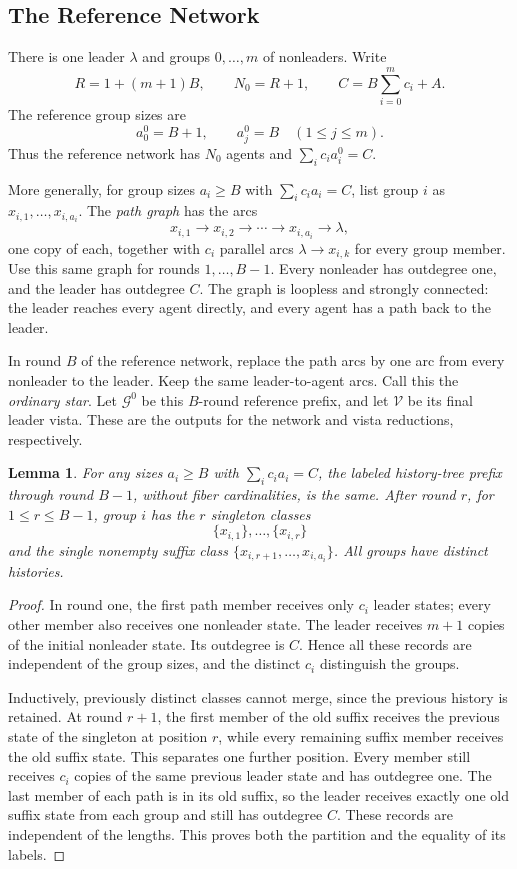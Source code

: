 \documentclass[11pt]{article}
\newtheorem{lemma}{Lemma}
\begin{document}
\subsection{The Reference Network}

There is one leader \(\lambda\) and groups \(0,\ldots,m\) of nonleaders. Write
\[
 R=1+(m+1)B,\qquad N_0=R+1,\qquad
 C=B\sum_{i=0}^m c_i+A.
\]
The reference group sizes are
\[
 a_0^0=B+1,\qquad a_j^0=B\quad(1\leq j\leq m).
\]
Thus the reference network has \(N_0\) agents and
\(\sum_i c_i a_i^0=C\).

More generally, for group sizes \(a_i\geq B\) with
\(\sum_i c_i a_i=C\), list group \(i\) as
\(x_{i,1},\ldots,x_{i,a_i}\).
The \emph{path graph} has the arcs
\[
 x_{i,1}\to x_{i,2}\to\cdots\to x_{i,a_i}\to\lambda,
\]
one copy of each, together with \(c_i\) parallel arcs
\(\lambda\to x_{i,k}\) for every group member.
Use this same graph for rounds \(1,\ldots,B-1\).
Every nonleader has outdegree one, and the leader has outdegree \(C\).
The graph is loopless and strongly connected: the leader reaches every
agent directly, and every agent has a path back to the leader.

In round \(B\) of the reference network, replace the path arcs by one arc from
every nonleader to the leader. Keep the same leader-to-agent arcs.
Call this the \emph{ordinary star}.
Let \(\mathcal G^0\) be this \(B\)-round reference prefix, and let
\(\mathcal V\) be its final leader vista. These are the outputs for the
network and vista reductions, respectively.

\begin{lemma}
\label{lem:conp-path-prefix}
For any sizes \(a_i\geq B\) with \(\sum_i c_i a_i=C\), the labeled
history-tree prefix through round \(B-1\), without fiber
cardinalities, is the same.
After round \(r\), for \(1\leq r\leq B-1\), group \(i\) has
the \(r\) singleton classes
\[
 \{x_{i,1}\},\ldots,\{x_{i,r}\}
\]
and the single nonempty suffix class
\(\{x_{i,r+1},\ldots,x_{i,a_i}\}\).
All groups have distinct histories.
\end{lemma}

\begin{proof}
In round one, the first path member receives only \(c_i\) leader
states; every other member also receives one nonleader state.
The leader receives \(m+1\) copies of the initial nonleader state.
Its outdegree is \(C\). Hence all these records are independent of the
group sizes, and the distinct \(c_i\) distinguish the groups.

Inductively, previously distinct classes cannot merge, since the
previous history is retained. At round \(r+1\), the first member of
the old suffix receives the previous state of the singleton at
position \(r\), while every remaining suffix member receives the old
suffix state. This separates one further position. Every member
still receives \(c_i\) copies of the same previous leader state and
has outdegree one.
The last member of each path is in its old suffix, so the leader
receives exactly one old suffix state from each group and still has
outdegree \(C\). These records are independent of the lengths.
This proves both the partition and the equality of its labels.
\end{proof}
\end{document}
